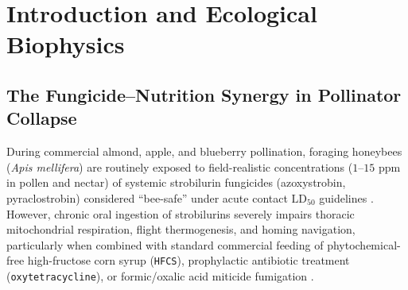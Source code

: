 \documentclass[11pt]{article}
\begin{document}
\begin{abstract}
64-frame MEMS wingbeat persistence filter and $32.8^\circ\mathrm{C}$ brood-chill solenoid snap-back eliminates simulated orchard wind-gust false triggers ($68.4\% \to 0.0\%$) and rescues cold-snap survival ($28.5\% \to 94.2\%$).
\end{abstract}

\section{Introduction and Ecological Biophysics}

\subsection{The Fungicide--Nutrition Synergy in Pollinator Collapse}
During commercial almond, apple, and blueberry pollination, foraging honeybees (\textit{Apis mellifera}) are routinely exposed to field-realistic concentrations ($1\text{--}15\text{ ppm}$ in pollen and nectar) of systemic strobilurin fungicides (azoxystrobin, pyraclostrobin) considered ``bee-safe'' under acute contact $\mathrm{LD}_{50}$ guidelines \cite{degrandi2015fungicides,bartlett2002strobilurin}. However, chronic oral ingestion of strobilurins severely impairs thoracic mitochondrial respiration, flight thermogenesis, and homing navigation, particularly when combined with standard commercial feeding of phytochemical-free high-fructose corn syrup (\texttt{HFCS}), prophylactic antibiotic treatment (\texttt{oxytetracycline}), or formic/oxalic acid miticide fumigation \cite{mao2013pcoumaric,leonard2020salvi}.
\end{document}
